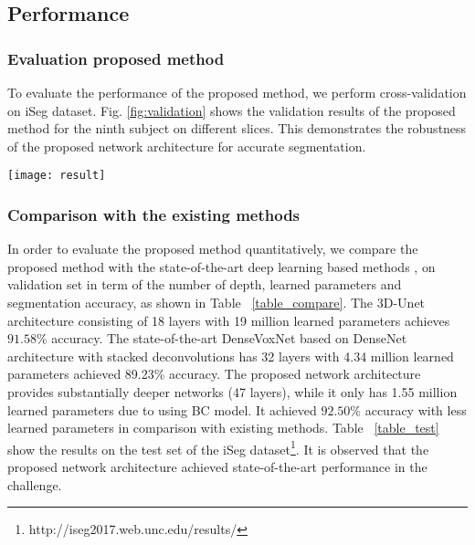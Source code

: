 \documentclass{llncs}
\begin{document}
\subsection{Performance}
\subsubsection{Evaluation proposed method} To evaluate the performance of the proposed method, we perform cross-validation on iSeg dataset. Fig. \ref{fig:validation} shows the validation results of the proposed method for the ninth subject on different slices. This demonstrates the robustness of the proposed network architecture for accurate segmentation. 
\begin{figure*}[ht]
   \centering
    \texttt{[image: result]}%
\caption{Segmentation result on different slice (a) T1 image, (b) T2 image, (c) DenseVoxNet, (d) our result, (e) manual segmentation}
   \label{fig:validation}%
\end{figure*}
\subsubsection{Comparison with the existing methods} In order to evaluate the proposed method quantitatively, we compare the proposed method with the state-of-the-art deep learning based methods \cite{cciccek20163d},  \cite{yu2017automatic} on validation set in term of the number of depth, learned parameters and segmentation accuracy, as shown in Table ~\ref{table_compare}. The 3D-Unet \cite{cciccek20163d} architecture consisting of 18 layers with 19 million learned parameters achieves $91.58$\% accuracy. The state-of-the-art DenseVoxNet \cite{yu2017automatic} based on DenseNet architecture with stacked deconvolutions has 32 layers with 4.34 million learned parameters achieved 89.23\% accuracy. The proposed network architecture provides substantially deeper networks (47 layers), while it only has 1.55 million learned parameters due to using BC model. It achieved $92.50\%$ accuracy with less learned parameters in comparison with existing methods. Table ~\ref{table_test} show the results on the test set of the iSeg dataset\footnote{http://iseg2017.web.unc.edu/results/}. It is observed that the proposed network architecture achieved state-of-the-art performance in the challenge.
\end{document}
